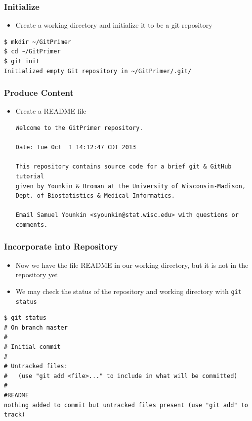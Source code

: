 \documentclass[12pt,t]{beamer}
\newcommand{\bbi}{\vspace{24pt} \begin{itemize} \itemsep8pt}
\newcommand{\ei}{\end{itemize}}
\begin{document}
\begin{frame}[fragile]
\frametitle{Initialize}
\bbi
\item Create a working directory and initialize it to be a git
  repository
\ei
\begin{semiverbatim}
\begin{lstlisting}
$ mkdir ~/GitPrimer
$ cd ~/GitPrimer
$ git init
Initialized empty Git repository in ~/GitPrimer/.git/
\end{lstlisting}
\end{semiverbatim}
\end{frame}

\begin{frame}[fragile]
\frametitle{Produce Content}
\bbi
\item Create a README file

\begin{semiverbatim}
\begin{lstlisting}
Welcome to the GitPrimer repository.

Date: Tue Oct  1 14:12:47 CDT 2013

This repository contains source code for a brief git & GitHub tutorial
given by Younkin & Broman at the University of Wisconsin-Madison,
Dept. of Biostatistics & Medical Informatics.

Email Samuel Younkin <syounkin@stat.wisc.edu> with questions or
comments.
\end{lstlisting}
\end{semiverbatim}
\ei
\end{frame}

\begin{frame}[fragile]
\frametitle{Incorporate into Repository}
\bbi
\item Now we have the file README in our working directory, but it is not in the repository yet
\item We may check the status of the repository and working directory with \texttt{git status}
\ei
\begin{semiverbatim}
\begin{lstlisting}
$ git status
# On branch master
#
# Initial commit
#
# Untracked files:
#   (use "git add <file>..." to include in what will be committed)
#
#README
nothing added to commit but untracked files present (use "git add" to track)
\end{lstlisting}
\end{semiverbatim}

\end{frame}
\end{document}
